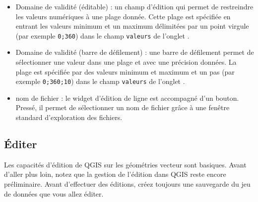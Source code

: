 \begin{itemize}
\item Domaine de validité (éditable) : un champ d'édition qui permet de restreindre les valeurs numériques à une plage donnée. Cette plage est spécifiée en entrant les valeurs minimum et un maximum délimitées par un point virgule (par exemple \verb|0;360|) dans le champ \texttt{valeurs} de l'onglet .
\item Domaine de validité (barre de défilement) : une barre de défilement permet de sélectionner une valeur dans une plage et avec une précision données. La plage est spécifiée par des valeurs minimum et maximum et un pas (par exemple \verb|0;360;10|) dans le champ \texttt{valeurs} de l'onglet .
\item nom de fichier : le widget d'édition de ligne est accompagné d'un bouton. Pressé, il permet de sélectionner un nom de fichier grâce à une fenêtre standard d'exploration des fichiers.
\end{itemize}

\subsection{Éditer}

Les capacités d'édition de QGIS sur les géométries vecteur sont basiques. Avant d'aller plus loin, notez que la gestion de l'édition dans QGIS reste encore préliminaire. Avant d'effectuer des éditions, créez toujours une sauvegarde du jeu de données que vous allez éditer.

